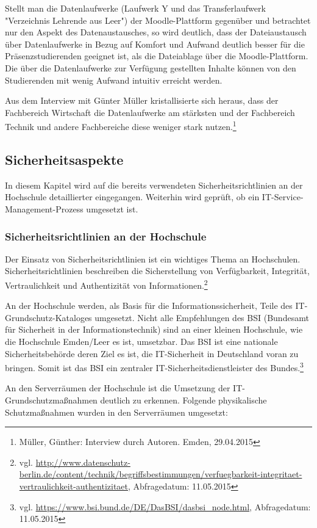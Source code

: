 Stellt man die Datenlaufwerke (Laufwerk Y und das Transferlaufwerk "Verzeichnis Lehrende aus Leer") der Moodle-Plattform gegenüber und betrachtet nur den Aspekt des Datenaustausches, so wird deutlich, dass der Dateiaustausch über Datenlaufwerke in Bezug auf Komfort und Aufwand deutlich besser für die Präsenzstudierenden geeignet ist, als die Dateiablage über die Moodle-Plattform. Die über die Datenlaufwerke zur Verfügung gestellten Inhalte können von den Studierenden mit wenig Aufwand intuitiv erreicht werden.

Aus dem Interview mit Günter Müller kristallisierte sich heraus, dass der Fachbereich Wirtschaft die Datenlaufwerke am stärksten und der Fachbereich Technik und andere Fachbereiche diese weniger stark nutzen.\footnote{Müller, Günther: Interview durch Autoren. Emden, 29.04.2015}

\subsection{Sicherheitsaspekte}
In diesem Kapitel wird auf die bereits verwendeten Sicherheitsrichtlinien an der Hochschule detaillierter eingegangen. Weiterhin wird geprüft, ob ein IT-Service-Management-Prozess  umgesetzt ist.

\subsubsection{Sicherheitsrichtlinien an der Hochschule}
Der Einsatz von Sicherheitsrichtlinien ist ein wichtiges Thema an Hochschulen. Sicherheitsrichtlinien beschreiben die Sicherstellung von Verfügbarkeit, Integrität, Vertraulichkeit und Authentizität von Informationen.\footnote{vgl. \url{http://www.datenschutz-berlin.de/content/technik/begriffsbestimmungen/verfuegbarkeit-integritaet-vertraulichkeit-authentizitaet}, Abfragedatum: 11.05.2015}

An der Hochschule werden, als Basis für die Informationssicherheit, Teile des IT-Grundschutz-Kataloges umgesetzt. Nicht alle Empfehlungen des BSI (Bundesamt für Sicherheit in der Informationstechnik) sind an einer kleinen Hochschule, wie die Hochschule Emden/Leer es ist,  umsetzbar. Das BSI ist eine nationale Sicherheitsbehörde deren Ziel es ist, die IT-Sicherheit in Deutschland voran zu bringen. Somit ist das BSI ein zentraler IT-Sicherheitsdienstleister des Bundes.\footnote{vgl. \url{https://www.bsi.bund.de/DE/DasBSI/dasbsi_node.html}, Abfragedatum: 11.05.2015}

An den Serverräumen der Hochschule ist die Umsetzung der IT-Grundschutzmaßnahmen deutlich zu erkennen.
Folgende physikalische Schutzmaßnahmen wurden in den Serverräumen umgesetzt:

